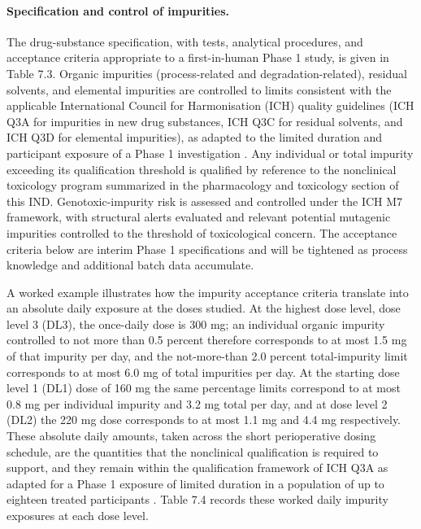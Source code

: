 \paragraph{Specification and control of impurities.}
The drug-substance specification, with tests, analytical procedures, and
acceptance criteria appropriate to a first-in-human Phase 1 study, is given in
Table 7.3. Organic impurities (process-related and degradation-related), residual
solvents, and elemental impurities are controlled to limits consistent with the
applicable International Council for Harmonisation (ICH) quality guidelines (ICH
Q3A for impurities in new drug substances, ICH Q3C for residual solvents, and
ICH Q3D for elemental impurities), as adapted to the limited duration and
participant exposure of a Phase 1 investigation
\cite{ichpaistduni,phase1guidance}. Any individual or total impurity exceeding
its qualification threshold is qualified by reference to the nonclinical
toxicology program summarized in the pharmacology and toxicology section of this
IND. Genotoxic-impurity risk is assessed and controlled under the ICH M7
framework, with structural alerts evaluated and relevant potential mutagenic
impurities controlled to the threshold of toxicological concern. The acceptance
criteria below are interim Phase 1 specifications and will be tightened as
process knowledge and additional batch data accumulate.

A worked example illustrates how the impurity acceptance criteria translate into
an absolute daily exposure at the doses studied. At the highest dose level, dose
level 3 (DL3), the once-daily dose is 300 mg; an individual organic impurity
controlled to not more than 0.5 percent therefore corresponds to at most 1.5 mg
of that impurity per day, and the not-more-than 2.0 percent total-impurity limit
corresponds to at most 6.0 mg of total impurities per day. At the starting dose
level 1 (DL1) dose of 160 mg the same percentage limits correspond to at most
0.8 mg per individual impurity and 3.2 mg total per day, and at dose level 2
(DL2) the 220 mg dose corresponds to at most 1.1 mg and 4.4 mg respectively.
These absolute daily amounts, taken across the short perioperative dosing
schedule, are the quantities that the nonclinical qualification is required to
support, and they remain within the qualification framework of ICH Q3A as
adapted for a Phase 1 exposure of limited duration in a population of up to
eighteen treated participants \cite{ichpaistduni,phase1guidance}. Table 7.4
records these worked daily impurity exposures at each dose level.

